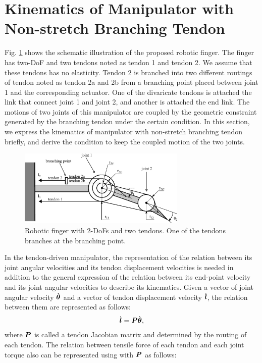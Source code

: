 \documentclass{llncs}
\def\vect#1{\mbox{\boldmath$#1$}}
\begin{document}
\section{Kinematics of Manipulator with Non-stretch Branching Tendon}
Fig. \ref{branching_model} shows the schematic illustration of the proposed robotic finger.
The finger has two-DoF and two tendons noted as tendon 1 and tendon 2.
We assume that these tendons has no elasticity.
Tendon 2 is branched into two different routings of tendon noted as tendon 2a and 2b from a branching point placed between joint 1 and the corresponding actuator.
One of the divaricate tendons is attached the link that connect joint 1 and joint 2, and another is attached the end link.
The motions of two joints of this manipulator are coupled by the geometric constraint generated by the branching tendon under the certain condition.
In this section, we express the kinematics of manipulator with non-stretch branching tendon briefly, and derive the condition to keep the coupled motion of the two joints. 
\begin{figure}[t]
	\begin{center}
	\includegraphics[width=80mm]{fig/coupled.eps}
	\end{center}
	\caption{Robotic finger with 2-DoFs and two tendons. One of the tendons branches at the branching point.}
	\label{branching_model}
\end{figure}
In the tendon-driven manipulator, the representation of the relation between its joint angular velocities and its tendon displacement velocities is needed in addition to the general expression of the relation between its end-point velocity and its joint angular velocities to describe its kinematics.
Given a vector of joint angular velocity $\dot{\vect{\theta}}$ and a vector of tendon displacement velocity $\dot{\vect{l}}$, the relation between them are represented as follows:
\begin{align}
	\dot{\vect{l}}=\vect{P}\dot{\vect{\theta}},
	\label{jaco}
\end{align}
where $\vect{P}$ is called a tendon Jacobian matrix and determined by the routing of each tendon.
The relation between tensile force of each tendon and each joint torque also can be represented using with $\vect{P}$ as follows:
\end{document}
